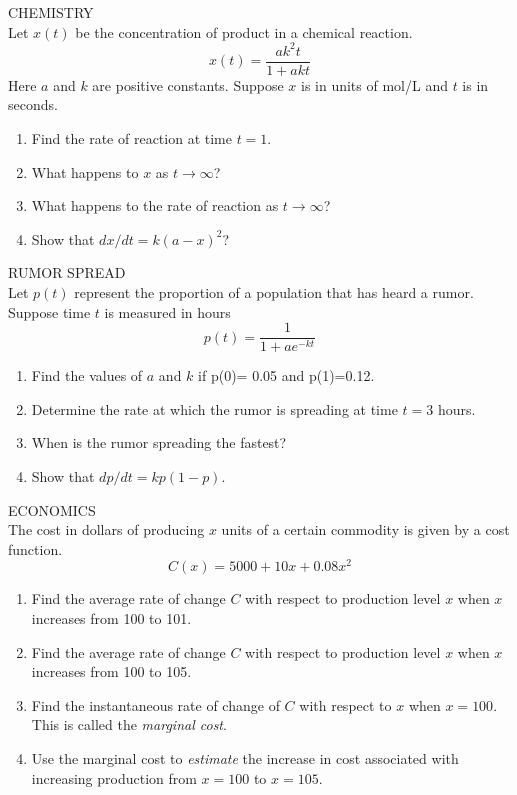 \documentclass[11pt]{article}
\begin{document}
\pagebreak

CHEMISTRY\\

Let $x(t)$ be the concentration of product in a chemical reaction.
\begin{displaymath}
x(t)=\frac{ak^2t}{1+akt}
\end{displaymath}
Here $a$ and $k$ are positive constants.  Suppose $x$ is in units of mol/L and $t$ is in seconds.
\begin{enumerate}
\item{Find the rate of reaction at time $t=1$.}
\item{What happens to $x$ as $t\to\infty$?}
\item{What happens to the rate of reaction as $t\to\infty$?}
\item{Show that $dx/dt = k(a-x)^2$?}  
  \end{enumerate}

\pagebreak

RUMOR SPREAD\\
Let $p(t)$ represent the proportion of a population that has heard a rumor.  Suppose time $t$ is measured in hours
\begin{displaymath}
p(t)=\frac{1}{1+ae^{-kt}}
\end{displaymath}
\begin{enumerate}
	\item {Find the values of $a$ and $k$ if p(0)= 0.05 and p(1)=0.12.}
	\item {Determine the rate at which the rumor is spreading at time $t=3$ hours.}
	\item {When is the rumor spreading the fastest?}
	\item{Show that $dp/dt = kp(1-p)$.}
\end{enumerate}

\vspace{1.5in}

\pagebreak

ECONOMICS\\
The cost in dollars of producing $x$ units of a certain commodity is given by a cost function.
\begin{displaymath}
C(x) = 5000+ 10x+ 0.08x^2
\end{displaymath}
\begin{enumerate}
	\item {Find the average rate of change $C$ with respect to production level $x$ when $x$ increases from 100 to 101.}
	\item {Find the average rate of change $C$ with respect to production level $x$ when $x$ increases from 100 to 105.}
	\item {Find the instantaneous rate of change of $C$ with respect to $x$ when $x=100$.  This is called the \emph{marginal cost}.}
	\item {Use the marginal cost to \emph{estimate} the increase in cost associated with increasing production from $x=100$ to $x=105$.}
\end{enumerate}
 
\end{document}

